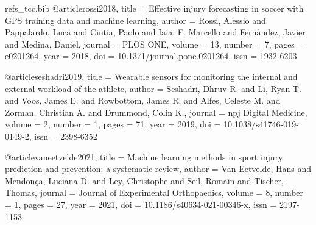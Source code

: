 \begin{filecontents*}[overwrite]{refs_tcc.bib}
@article{rossi2018,
  title   = {Effective injury forecasting in soccer with {GPS} training data and machine learning},
  author  = {Rossi, Alessio and Pappalardo, Luca and Cintia, Paolo and Iaia, F. Marcello and Fern{\`a}ndez, Javier and Medina, Daniel},
  journal = {PLOS ONE},
  volume  = {13},
  number  = {7},
  pages   = {e0201264},
  year    = {2018},
  doi     = {10.1371/journal.pone.0201264},
  issn    = {1932-6203}
}

@article{seshadri2019,
  title   = {Wearable sensors for monitoring the internal and external workload of the athlete},
  author  = {Seshadri, Dhruv R. and Li, Ryan T. and Voos, James E. and Rowbottom, James R. and Alfes, Celeste M. and Zorman, Christian A. and Drummond, Colin K.},
  journal = {npj Digital Medicine},
  volume  = {2},
  number  = {1},
  pages   = {71},
  year    = {2019},
  doi     = {10.1038/s41746-019-0149-2},
  issn    = {2398-6352}
}

@article{vaneetvelde2021,
  title   = {Machine learning methods in sport injury prediction and prevention: a systematic review},
  author  = {Van Eetvelde, Hans and Mendon{\c{c}}a, Luciana D. and Ley, Christophe and Seil, Romain and Tischer, Thomas},
  journal = {Journal of Experimental Orthopaedics},
  volume  = {8},
  number  = {1},
  pages   = {27},
  year    = {2021},
  doi     = {10.1186/s40634-021-00346-x},
  issn    = {2197-1153}
}
\end{filecontents*}

\documentclass[portuguese,oneside]{tcc}

\usepackage{graphicx}
\usepackage{multirow}
\usepackage{nicefrac}
\usepackage{algorithmic}
\usepackage{float}
\usepackage{amsmath}
\usepackage{amssymb}
\usepackage{booktabs}
\usepackage{array}
\usepackage{longtable}
\usepackage{xurl}

\newcolumntype{L}[1]{>{\footnotesize\raggedright\arraybackslash\hspace{0pt}}p{#1}}

